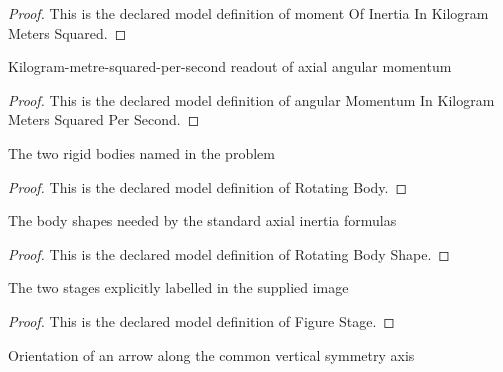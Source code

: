 \begin{proof}
  This is the declared model definition of moment Of Inertia In Kilogram Meters Squared.
\end{proof}
\begin{definition}
  \label{def:physics:phyx-mini-0712:phyxminiproblems-problemphyxmini0712-angularmomentuminkilogrammeterssquaredpersecond}
  Kilogram-metre-squared-per-second readout of axial angular momentum
\end{definition}
\begin{proof}
  This is the declared model definition of angular Momentum In Kilogram Meters Squared Per Second.
\end{proof}
\begin{definition}
  \label{def:physics:phyx-mini-0712:phyxminiproblems-problemphyxmini0712-rotatingbody}
  The two rigid bodies named in the problem
\end{definition}
\begin{proof}
  This is the declared model definition of Rotating Body.
\end{proof}
\begin{definition}
  \label{def:physics:phyx-mini-0712:phyxminiproblems-problemphyxmini0712-rotatingbodyshape}
  The body shapes needed by the standard axial inertia formulas
\end{definition}
\begin{proof}
  This is the declared model definition of Rotating Body Shape.
\end{proof}
\begin{definition}
  \label{def:physics:phyx-mini-0712:phyxminiproblems-problemphyxmini0712-figurestage}
  The two stages explicitly labelled in the supplied image
\end{definition}
\begin{proof}
  This is the declared model definition of Figure Stage.
\end{proof}
\begin{definition}
  \label{def:physics:phyx-mini-0712:phyxminiproblems-problemphyxmini0712-axialdirection}
  Orientation of an arrow along the common vertical symmetry axis
\end{definition}
